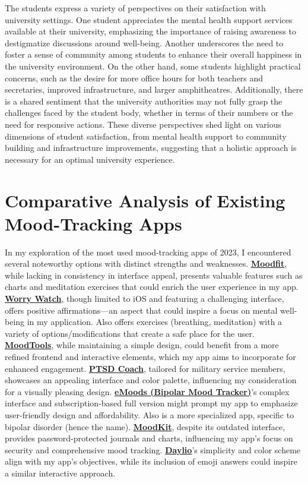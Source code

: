 \documentclass[11pt]{report}
\begin{document}
The students express a variety of perspectives on their satisfaction with university settings. One student appreciates the mental health support services available at their university, emphasizing the importance of raising awareness to destigmatize discussions around well-being. Another underscores the need to foster a sense of community among students to enhance their overall happiness in the university environment. On the other hand, some students highlight practical concerns, such as the desire for more office hours for both teachers and secretaries, improved infrastructure, and larger amphitheatres. Additionally, there is a shared sentiment that the university authorities may not fully grasp the challenges faced by the student body, whether in terms of their numbers or the need for responsive actions. These diverse perspectives shed light on various dimensions of student satisfaction, from mental health support to community building and infrastructure improvements, suggesting that a holistic approach is necessary for an optimal university experience.


\section{Comparative Analysis of Existing Mood-Tracking Apps}

In my exploration of the most used mood-tracking apps of 2023, I encountered several noteworthy options with distinct strengths and weaknesses. \textbf{\href{https://www.getmoodfit.com/}{Moodfit}}, while lacking in consistency in interface appeal, presents valuable features such as charts and meditation exercises that could enrich the user experience in my app. \textbf{\href{https://worrywatch.com/}{Worry Watch}}, though limited to iOS and featuring a challenging interface, offers positive affirmations—an aspect that could inspire a focus on mental well-being in my application. Also offers exercises (breathing, meditation) with a variety of options/modifications that create a safe place for the user. \textbf{\href{https://www.moodtools.org/}{MoodTools}}, while maintaining a simple design, could benefit from a more refined frontend and interactive elements, which my app aims to incorporate for enhanced engagement. \textbf{\href{https://mobile.va.gov/app/ptsd-coach}{PTSD Coach}}, tailored for military service members, showcases an appealing interface and color palette, influencing my consideration for a visually pleasing design. \textbf{\href{https://emoodtracker.com/}{eMoods (Bipolar Mood Tracker)}}'s complex interface and subscription-based full version might prompt my app to emphasize user-friendly design and affordability. Also is a more specialized app, specific to bipolar disorder (hence the name). \textbf{\href{https://www.thriveport.com/products/moodkit/}{MoodKit}}, despite its outdated interface, provides password-protected journals and charts, influencing my app's focus on security and comprehensive mood tracking. \textbf{\href{https://daylio.net/}{Daylio}}'s simplicity and color scheme align with my app's objectives, while its inclusion of emoji answers could inspire a similar interactive approach.
\end{document}
